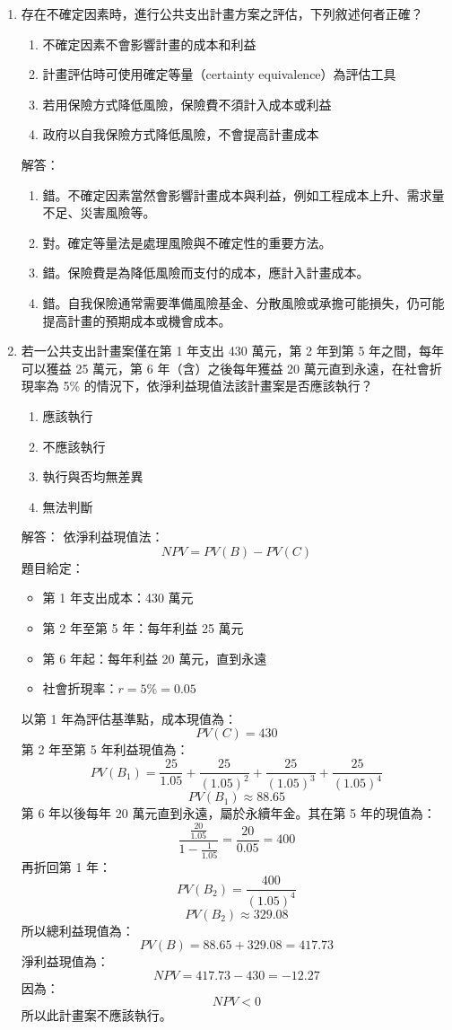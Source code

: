 \documentclass[12pt, a4paper]{article}
\begin{document}
\begin{enumerate}
    \item 存在不確定因素時，進行公共支出計畫方案之評估，下列敘述何者正確？
    \begin{enumerate}[label=\Alph*.]
        \item 不確定因素不會影響計畫的成本和利益
        \item 計畫評估時可使用確定等量（certainty equivalence）為評估工具
        \item 若用保險方式降低風險，保險費不須計入成本或利益
        \item 政府以自我保險方式降低風險，不會提高計畫成本
    \end{enumerate}
    解答：
    \begin{enumerate}[label=\Alph*.]
        \item 錯。不確定因素當然會影響計畫成本與利益，例如工程成本上升、需求量不足、災害風險等。
        \item 對。確定等量法是處理風險與不確定性的重要方法。
        \item 錯。保險費是為降低風險而支付的成本，應計入計畫成本。
        \item 錯。自我保險通常需要準備風險基金、分散風險或承擔可能損失，仍可能提高計畫的預期成本或機會成本。
    \end{enumerate}

    \item 若一公共支出計畫案僅在第 1 年支出 430 萬元，第 2 年到第 5 年之間，每年可以獲益 25 萬元，第 6 年（含）之後每年獲益 20 萬元直到永遠，在社會折現率為 5\% 的情況下，依淨利益現值法該計畫案是否應該執行？
    \begin{enumerate}[label=\Alph*.]
        \item 應該執行
        \item 不應該執行
        \item 執行與否均無差異
        \item 無法判斷
    \end{enumerate}
    解答：
    依淨利益現值法：
    \[
    NPV = PV(B) - PV(C)
    \]
    題目給定：
    \begin{itemize}
        \item 第 1 年支出成本：430 萬元
        \item 第 2 年至第 5 年：每年利益 25 萬元
        \item 第 6 年起：每年利益 20 萬元，直到永遠
        \item 社會折現率：\(r = 5\% = 0.05\)
    \end{itemize}
    以第 1 年為評估基準點，成本現值為：
    \[
    PV(C) = 430
    \]
    第 2 年至第 5 年利益現值為：
    \[
    PV(B_1)=\frac{25}{1.05}+\frac{25}{(1.05)^2}+\frac{25}{(1.05)^3}+\frac{25}{(1.05)^4}
    \]
    \[
    PV(B_1) \approx 88.65
    \]
    第 6 年以後每年 20 萬元直到永遠，屬於永續年金。其在第 5 年的現值為：
    \[
    \frac{\frac{20}{1.05}}{1-\frac{1}{1.05}} = \frac{20}{0.05}=400
    \]
    再折回第 1 年：
    \[
    PV(B_2)=\frac{400}{(1.05)^4}
    \]
    \[
    PV(B_2) \approx 329.08
    \]
    所以總利益現值為：
    \[
    PV(B)=88.65+329.08=417.73
    \]
    淨利益現值為：
    \[
    NPV = 417.73 - 430 = -12.27
    \]
    因為：
    \[
    NPV < 0
    \]
    所以此計畫案不應該執行。


\end{enumerate}
\end{document}
